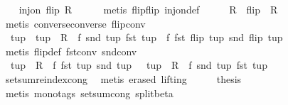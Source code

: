 \begin{isabellebody}
\ \ \isamarkupfalse%
\ {\isachardoublequoteopen}inj{\isacharunderscore}on\ flip\ {\isacharparenleft}R{\isasyminverse}{\isacharparenright}{\isachardoublequoteclose}\isanewline
\ \ \ \ \isamarkupfalse%
\ {\isacharparenleft}metis\ flip{\isacharunderscore}flip\ inj{\isacharunderscore}on{\isacharunderscore}def{\isacharparenright}\isanewline
\ \ \isamarkupfalse%
\ \isamarkupfalse%
\ {\isachardoublequoteopen}R\ {\isacharequal}\ flip\ {\isacharbackquote}\ {\isacharparenleft}R{\isasyminverse}{\isacharparenright}{\isachardoublequoteclose}\isanewline
\ \ \ \ \isamarkupfalse%
\ {\isacharparenleft}metis\ converse{\isacharunderscore}converse\ flip{\isacharunderscore}conv{\isacharparenright}\isanewline
\ \ \isamarkupfalse%
\ \isamarkupfalse%
\ {\isachardoublequoteopen}{\isasymAnd}\ tup\ {\isachardot}\ tup\ {\isasymin}\ R{\isasyminverse}\ {\isasymLongrightarrow}\ f\ {\isacharparenleft}snd\ tup{\isacharparenright}\ {\isacharparenleft}fst\ tup{\isacharparenright}\ {\isacharequal}\ f\ {\isacharparenleft}fst\ {\isacharparenleft}flip\ tup{\isacharparenright}{\isacharparenright}\ {\isacharparenleft}snd\ {\isacharparenleft}flip\ tup{\isacharparenright}{\isacharparenright}{\isachardoublequoteclose}\isanewline
\ \ \ \ \isamarkupfalse%
\ {\isacharparenleft}metis\ flip{\isacharunderscore}def\ fst{\isacharunderscore}conv\ snd{\isacharunderscore}conv{\isacharparenright}\isanewline
\ \ \isamarkupfalse%
\ \isamarkupfalse%
\ {\isachardoublequoteopen}{\isacharparenleft}{\isasymSum}\ tup\ {\isasymin}\ R\ {\isachardot}\ f\ {\isacharparenleft}fst\ tup{\isacharparenright}\ {\isacharparenleft}snd\ tup{\isacharparenright}{\isacharparenright}\ {\isacharequal}\ {\isacharparenleft}{\isasymSum}\ tup\ {\isasymin}\ R{\isasyminverse}\ {\isachardot}\ f\ {\isacharparenleft}snd\ tup{\isacharparenright}\ {\isacharparenleft}fst\ tup{\isacharparenright}{\isacharparenright}{\isachardoublequoteclose}\isanewline
\ \ \ \ \isamarkupfalse%
\ setsum{\isachardot}reindex{\isacharunderscore}cong\ \isamarkupfalse%
\ {\isacharparenleft}metis\ {\isacharparenleft}erased{\isacharcomma}\ lifting{\isacharparenright}{\isacharparenright}\isanewline
\ \ \isamarkupfalse%
\ \isamarkupfalse%
\ {\isacharquery}thesis\isanewline
\ \ \ \ \isamarkupfalse%
\ {\isacharparenleft}metis\ {\isacharparenleft}mono{\isacharunderscore}tags{\isacharparenright}\ setsum{\isachardot}cong\ split{\isacharunderscore}beta{\isacharparenright}\isanewline

\end{isabellebody}
